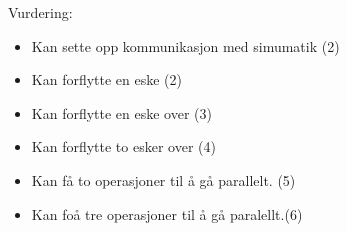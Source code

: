 Vurdering:
\begin{itemize}[noitemsep]
	\item Kan sette opp kommunikasjon med simumatik (2)
	\item Kan forflytte en eske (2)
	\item Kan forflytte en eske over (3)
	\item Kan forflytte to esker over (4)
	\item Kan få to operasjoner til å gå parallelt. (5)
	\item Kan foå tre operasjoner til å gå paralellt.(6)
\end{itemize}




